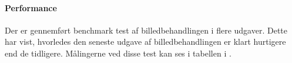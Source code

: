 \paragraph{Performance}
Der er gennemført benchmark test af billedbehandlingen i flere udgaver. Dette har vist, hvorledes den seneste udgave af billedbehandlingen er klart hurtigere end de tidligere. Målingerne ved disse test kan ses i tabellen i .

\begin{comment}
	
Webcam
	Varetager forbindelse til webcam
	Henter BufferedImage i 320x240

Processor
	Billede ind som BufferedImage
	Parse til 2D-array
	Filtrering
	Optimering i walker
	Objekt-/robot ID
	Obstacle map
	Grafisk repræsentation
	Scaling (ej i brug)
	Returnerer Locations objekt til brug i pathfinder
	
Udviklingsproces
	Simpelt udgangspunkt
	Løbende tilføjet funktionalitet med behov fra stifinding
	Efter første full cycle udviklet i version 2 med optimeringer
	
Test
	Program t visuel test
	"Webcam-simulator"
	Benchmark kørsler, resultater
	Performance udvikling
\end{comment}